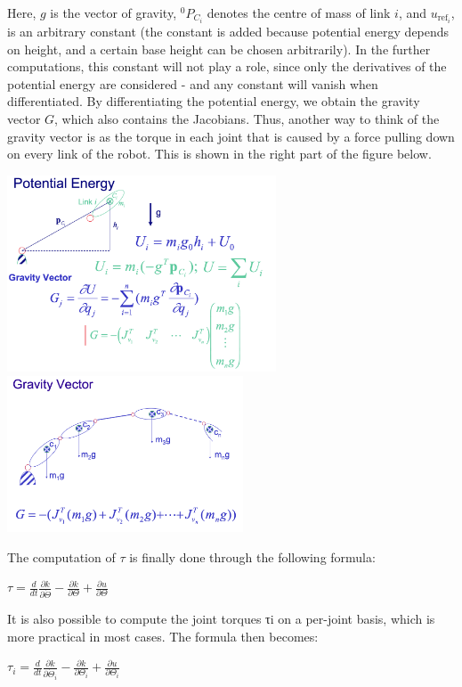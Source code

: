 Here, $g$ is the vector of gravity, ${ }^{0} P_{C_{i}}$ denotes the centre of mass of link $i$, and $u_{\mathrm{ref}_{i}}$, is an arbitrary constant (the constant is added because potential energy depends on height, and a certain base height can be chosen arbitrarily). In the further computations, this constant will not play a role, since only the derivatives of the potential energy are considered - and any constant will vanish when differentiated. 
By differentiating the potential energy, we obtain the gravity vector $G$, which also contains the Jacobians. Thus, another way to think of the gravity vector is as the torque in each joint that is caused by a force pulling down on every link of the robot. This is shown in the right part of the figure below.

\begin{center}
	\includegraphics[width=8cm]{sections/imgs/6_lagrange_potential_energy.png}
	\hfill
	\includegraphics[width=7cm]{sections/imgs/6_lagrange_potential_energy_2.png}
\end{center}

The computation of $\tau$ is finally done through the following formula:

\begin{center}
	$\tau=\frac{d}{d t} \frac{\partial k}{\partial \dot{\Theta}}-\frac{\partial k}{\partial \Theta}+\frac{\partial u}{\partial \Theta}$
\end{center}

It is also possible to compute the joint torques τi on a per-joint basis, which is more practical in most cases. The formula then becomes:

\begin{center}
	$\tau_{i}=\frac{d}{d t} \frac{\partial k}{\partial \dot{\Theta}_{i}}-\frac{\partial k}{\partial \Theta_{i}}+\frac{\partial u}{\partial \Theta_{i}}$
\end{center}